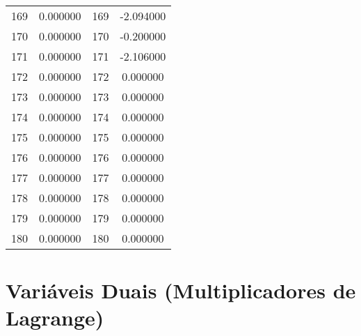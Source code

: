 \documentclass[12pt]{article}
\begin{document}
\begin{longtable}{@{}cccc@{}}
169 & 0.000000 & 169 & -2.094000 \\
170 & 0.000000 & 170 & -0.200000 \\
171 & 0.000000 & 171 & -2.106000 \\
172 & 0.000000 & 172 & 0.000000 \\
173 & 0.000000 & 173 & 0.000000 \\
174 & 0.000000 & 174 & 0.000000 \\
175 & 0.000000 & 175 & 0.000000 \\
176 & 0.000000 & 176 & 0.000000 \\
177 & 0.000000 & 177 & 0.000000 \\
178 & 0.000000 & 178 & 0.000000 \\
179 & 0.000000 & 179 & 0.000000 \\
180 & 0.000000 & 180 & 0.000000 \\

\end{longtable}

\section{Variáveis Duais (Multiplicadores de Lagrange)}
\end{document}
